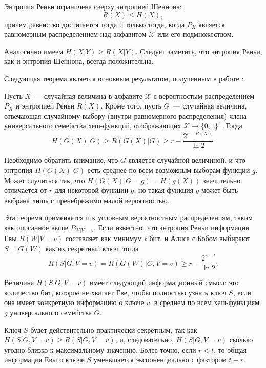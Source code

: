 \begin{statement}
  Энтропия Реньи ограничена сверху энтропией Шеннона:
  $$ R(X) \leq H(X), $$
  причем равенство достигается тогда и только тогда, когда $P_X$ является равномерным распределением над алфавитом $\mathcal{X}$ или его подмножеством.
\end{statement}

Аналогично имеем $H(X|Y) \geq R(X|Y)$. Следует заметить, что энтропия Реньи, как и энтропия Шеннона, всегда положительна.

Следующая теорема является основным результатом, полученным в работе \cite{privacy_amplification}:

\begin{theorem}
  Пусть $X$~--- случайная величина в алфавите $\mathcal{X}$ с вероятностым распределением $P_X$ и энтропией Реньи $R(X)$. Кроме того, пусть $G$~--- случайная величина, отвечающая случайному выбору (внутри равномерного распределения) члена универсального семейства хеш-функций, отображающих $\mathcal{X} \rightarrow \{0,1\}^r$. Тогда
  \begin{equation}
    H(G(X)|G) \geq R(G(X)|G) \geq r - \frac{2^{r - R(X)}}{\ln 2}.
  \end{equation}
\end{theorem}

Необходимо обратить внимание, что $G$ является случайной величиной, и что энтропия $H(G(X)|G)$ есть среднее по всем возможным выборам функции $g$. Может случиться так, что $H(G(X)|G=g) = H(g(X))$ значительно отличается от $r$ для некоторой функции $g$, но такая функция $g$ может быть выбрана лишь с пренебрежимо малой вероятностью.

Эта теорема применяется и к условным вероятностным распределениям, таким как описанное выше $P_{W|V=v}$. Если известно, что энтропия Реньи информации Евы $R(W|V=v)$ составляет как минимум $t$ бит, и Алиса с Бобом выбирают $S = G(W)$ как их секретный ключ, тогда
\begin{equation}
  R(S|G,V=v) = R(G(W)|G,V=v) \geq r - \frac{2^{r - t}}{\ln 2}.
\end{equation}

Величина $H(S|G,V=v)$ имеет следующий информационный смысл: это количество бит, котороe не хватает Еве, чтобы полностью узнать ключ $S$, если она имеет конкретную информацию о ключе $v$, в среднем по всем хеш-функциям $g$ универсального семейства $G$.

Ключ $S$ будет действительно практически секретным, так как $H(S|G,V=v) \geq R(S|G,V=v)$, и, следовательно, $H(S|G,V=v)$ сколько угодно близко к максимальному значению. Более точно, если $r < t$, то общая информация Евы о ключе $S$ уменьшается экспоненциально с фактором $t-r$.





